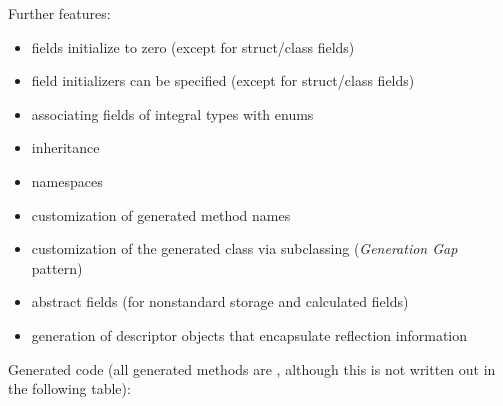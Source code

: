 Further features:

\begin{itemize}
  \item fields initialize to zero (except for struct/class fields)
  \item field initializers can be specified (except for struct/class fields)
  \item associating fields of integral types with enums
  \item inheritance
  \item namespaces
  \item customization of generated method names
  \item customization of the generated class via subclassing (\textit{Generation Gap} pattern)
  \item abstract fields (for nonstandard storage and calculated fields)
  \item generation of descriptor objects that encapsulate reflection information
\end{itemize}

Generated code (all generated methods are , although
this is not written out in the following table):

